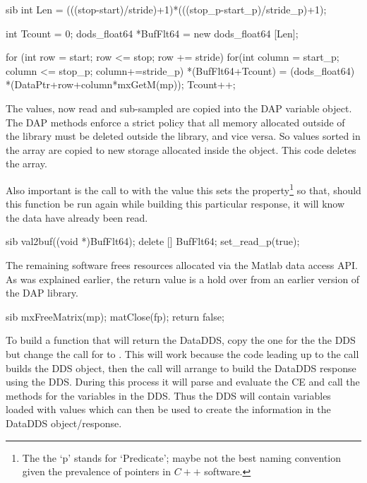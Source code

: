 \documentclass{dods-paper}
\begin{document}
\begin{vcode}{sib}
    int Len = (((stop-start)/stride)+1)*(((stop_p-start_p)/stride_p)+1);
  
    int Tcount = 0;
    dods_float64 *BufFlt64 = new dods_float64 [Len];    
  
    for (int row = start; row <= stop; row += stride) {          
        for(int column = start_p; column <= stop_p; column+=stride_p) {
            *(BufFlt64+Tcount) = (dods_float64) *(DataPtr+row+column*mxGetM(mp));  
            Tcount++;
        }
    }
\end{vcode}

The values, now read and sub-sampled are copied into the DAP variable object.
The DAP methods enforce a strict policy that all memory allocated outside of
the library must be deleted outside the library, and vice versa. So values
sorted in the  array are copied to new storage allocated inside
the  object. This code deletes the  array.

Also important is the call to  with the value 
this sets the  property\footnote{The the `p' stands for
  `Predicate'; maybe not the best naming convention given the prevalence of
  pointers in $C++$ software.} so that, should this function be run again
while building this particular response, it will know the data have already
been read.
 
\begin{vcode}{sib}
    val2buf((void *)BufFlt64);
    delete [] BufFlt64;
    set_read_p(true);      
\end{vcode}

The remaining software frees resources allocated via the Matlab data access
API. As was explained earlier, the  return value is a hold over
from an earlier version of the DAP library. 

\begin{vcode}{sib}
    mxFreeMatrix(mp);
    matClose(fp);
    return false;
\end{vcode}

To build a  function that will return the DataDDS, copy the one
for the the DDS but change the call for  to
. This will work because the code leading up
to the  call builds the DDS object, then the
 call will arrange to build the DataDDS response using the
DDS. During this process it will parse and evaluate the CE and call the
 methods for the variables in the DDS. Thus the DDS will contain
variables loaded with values which can then be used to create the information
in the DataDDS object/response.
\end{document}
